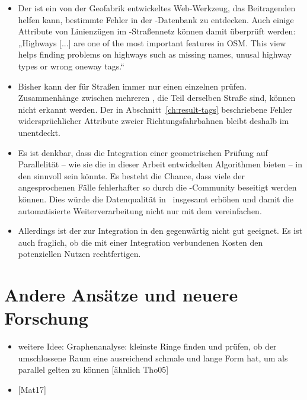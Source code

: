\documentclass[../main/thesis.tex]{subfiles}
\begin{document}
\begin{itemize}

\item
Der  ist ein von der Geofabrik entwickeltes Web-Werkzeug, das Beitragenden helfen kann, bestimmte Fehler in der \osm-Datenbank zu entdecken.
Auch einige Attribute von Linienzügen im \osm-Straßennetz können damit überprüft werden:
„Highways [...] are one of the most important features in OSM.
This view helps finding problems on highways such as missing names, unusal highway types or wrong oneway tags.“

\item
Bisher kann der  für Straßen immer nur einen einzelnen  prüfen.
Zusammenhänge zwischen mehreren , die Teil derselben Straße sind, können nicht erkannt werden.
Der in Abschnitt~\ref{ch:result-tags} beschriebene Fehler widersprüchlicher Attribute zweier Richtungsfahrbahnen bleibt deshalb im  unentdeckt.

\item
Es ist denkbar, dass die Integration einer geometrischen Prüfung auf Parallelität -- wie sie die in dieser Arbeit entwickelten Algorithmen bieten -- in den  sinnvoll sein könnte.
Es besteht die Chance, dass viele der angesprochenen Fälle fehlerhafter  so durch die \osm-Community beseitigt werden können.
Dies würde die Datenqualität in \osm\ insgesamt erhöhen und damit die automatisierte Weiterverarbeitung nicht nur mit dem  vereinfachen.

\item
Allerdings ist der  zur Integration in den  gegenwärtig nicht gut geeignet.
Es ist auch fraglich, ob die mit einer Integration verbundenen Kosten den potenziellen Nutzen rechtfertigen.

\end{itemize}



\section{Andere Ansätze und neuere Forschung}

\begin{itemize}
\item weitere Idee: Graphenanalyse: kleinste Ringe finden und prüfen, ob der umschlossene Raum eine ausreichend schmale und lange Form hat, um als parallel gelten zu können [ähnlich Tho05]
\item {[Mat17]}
\end{itemize}




\end{document}
